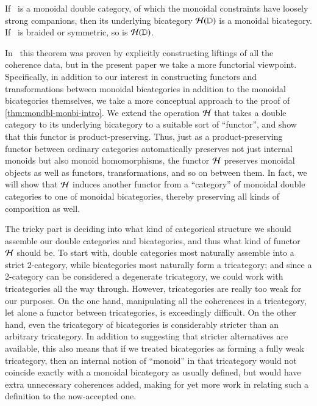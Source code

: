 \begin{thm}\label{thm:mondbl-monbi-intro}
  If \lD\ is a monoidal double category, of which the monoidal constraints have loosely strong companions, then its underlying bicategory $\mathcal{H}(\mathbb{D})$ is a monoidal bicategory.  If \lD\ is braided
  or symmetric, so is $\mathcal{H}(\mathbb{D})$.
\end{thm}

In~\cite{shulman:smbicat} this theorem was proven by explicitly constructing liftings of all the coherence data, but in the present paper we take a more functorial viewpoint.
Specifically, in addition to our interest in constructing functors and transformations between monoidal bicategories in addition to the monoidal bicategories themselves, we take a more conceptual approach to the proof of \cref{thm:mondbl-monbi-intro}.
We extend the operation $\mathcal{H}$ that takes a double category to its underlying bicategory to a suitable sort of ``functor'', and show that this functor is product-preserving.
Thus, just as a product-preserving functor between ordinary categories automatically preserves not just internal monoids but also monoid homomorphisms, the functor $\mathcal{H}$ preserves monoidal objects as well as functors, transformations, and so on between them.
In fact, we will show that $\mathcal{H}$ induces another functor from a ``category'' of monoidal double categories to one of monoidal bicategories, thereby preserving all kinds of composition as well.

The tricky part is deciding into what kind of categorical structure we should assemble our double categories and bicategories, and thus what kind of functor $\mathcal{H}$ should be.
To start with, double categories most naturally assemble into a strict 2-category, while bicategories most naturally form a tricategory; and since a 2-category can be considered a degenerate tricategory, we could work with tricategories all the way through.
However, tricategories are really too weak for our purposes.
On the one hand, manipulating all the coherences in a tricategory, let alone a functor between tricategories, is exceedingly difficult.
On the other hand, even the tricategory of bicategories is considerably stricter than an arbitrary tricategory.
In addition to suggesting that stricter alternatives are available, this also means that if we treated bicategories as forming a fully weak tricategory, then an internal notion of ``monoid'' in that tricategory would not coincide exactly with a monoidal bicategory as usually defined, but would have extra unnecessary coherences added, making for yet more work in relating such a definition to the now-accepted one.

